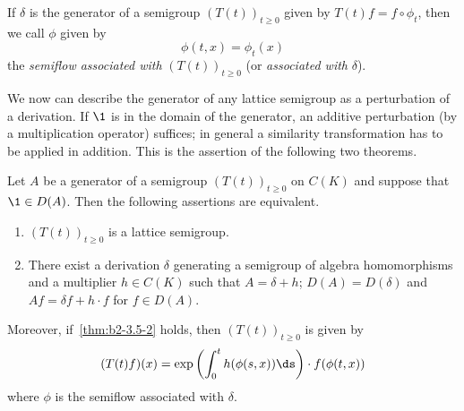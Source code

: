 If\/ $\delta$ is the generator of a semigroup $(T(t))_{t \geq 0}$ given by $T(t)f = f \circ \phi_{t}$, then we call $\phi$ given by 
%
\[
	\phi(t,x) = \phi_{t}(x)
\]
%
the \emph{semiflow associated with} $(T(t))_{t \geq 0}$ (or \emph{associated with} $\delta$).

We now can describe the generator of any lattice semigroup as a perturbation of a derivation.
If\/ $\1$ is in the domain of the generator, an additive perturbation (by a multiplication operator) suffices; in general a similarity transformation has to be applied in addition.
This is the assertion of the following two theorems.
\begin{theorem}\label{thm:b2-3.5}
Let $A$ be a generator of a semigroup $(T(t))_{t \geq 0}$ on $C(K)$ and suppose that $\1 \in D(A)$.
Then the following assertions are equivalent.
\begin{enumerate}[\upshape (a)]
\item \label{thm:b2-3.5-1}
$(T(t))_{t \geq 0}$ is a lattice semigroup.
\item \label{thm:b2-3.5-2}
There exist a derivation $\delta$ generating a semigroup of algebra homomorphisms and a multiplier $h \in C(K)$ such that $A = \delta + h$; \ie  $D(A) = D(\delta)$ and $Af = \delta f + h \cdot f$ for $f \in D(A)$.
\end{enumerate}

Moreover, if~\ref{thm:b2-3.5-2} holds, then $(T(t))_{t \geq 0}$ is given by
\begin{equation}\label{eq:b2-3.6}
(T(t)f)(x) = \exp\left(\int_{0}^{t} h(\phi(s,x)) \ds \right) \cdot f(\phi(t,x))
\end{equation}
where $\phi$ is the semiflow associated with $\delta$.
\end{theorem}
